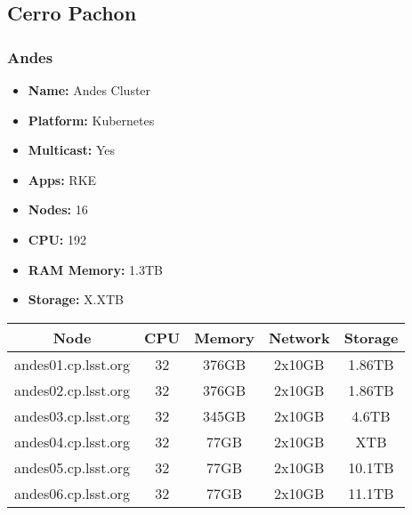 \newpage
\subsection{Cerro Pachon}
\subsubsection{Andes}
\begin{itemize}
  \itemsep0em 
  \item \textbf{Name:}       Andes Cluster
  \item \textbf{Platform:}   Kubernetes
  \item \textbf{Multicast:}  Yes
  \item \textbf{Apps:}       RKE
  \item \textbf{Nodes:}      16
  \item \textbf{CPU:}        192
  \item \textbf{RAM Memory:} 1.3TB
  \item \textbf{Storage:}   X.XTB
\end{itemize}
\begin{center}
  \small
  \begin{tabular}{||c c c c c||} 
    \hline
    \textbf{Node} & \textbf{CPU} & \textbf{Memory} & \textbf{Network} & \textbf{Storage} \\ [0.5ex]
    \hline
    andes01.cp.lsst.org & 32 & 376GB & 2x10GB & 1.86TB \\
    \hline
    andes02.cp.lsst.org & 32 & 376GB & 2x10GB & 1.86TB \\
    \hline
    andes03.cp.lsst.org & 32 & 345GB & 2x10GB & 4.6TB \\
    \hline
    andes04.cp.lsst.org & 32 & 77GB & 2x10GB & XTB \\
    \hline
    andes05.cp.lsst.org & 32 & 77GB & 2x10GB & 10.1TB\\
    \hline
    andes06.cp.lsst.org & 32 & 77GB & 2x10GB & 11.1TB \\
    \hline
  \end{tabular}
\end{center}

\newpage
